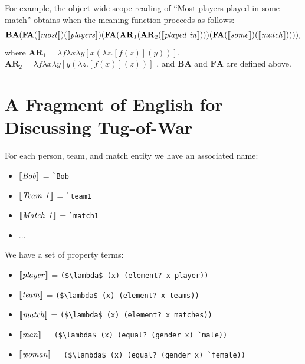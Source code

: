 \documentclass[pdfextras]{handbook}
\newcommand{\llbracket}{\ensuremath{\left [\!\left [}}%
\newcommand{\rrbracket}{\ensuremath{\right ]\!\right ]}}
\providecommand{\sv}[1]{\ensuremath{\llbracket \mathit{#1} \rrbracket}}
\newcommand{\denot}[1]{\ensuremath{\llbracket \mathit{#1} \rrbracket}}
\begin{document}
For example, the object wide scope reading of ``Most players played in some match'' obtains when the meaning function proceeds as follows: 
$$
\mathbf{BA}(\mathbf{FA}(\sv{most})(\sv{players})
(\mathbf{FA}(\mathbf{AR}_1(\mathbf{AR}_2(\sv{played\ in})))
(\mathbf{FA}(\sv{some})(\sv{match})))),
$$  
where $\mathbf{AR}_1 = \lambda f \lambda x \lambda y [x(\lambda z . [f(z)] (y))]$, $\mathbf{AR}_2 = \lambda f \lambda x \lambda y [y(\lambda z . [f(x)] (z))]$ \cite[cf.][pp.453ff.]{barker05}, and $\mathbf{BA}$ and $\mathbf{FA}$ are defined above.




\section{A Fragment of English for Discussing Tug-of-War}
\label{tow-lexicon}

For each person, team, and match entity we have an associated name:
\begin{itemize}
\item \denot{Bob} = \lstinline{`Bob}
\item \denot{Team\ 1} = \lstinline{`team1}
\item \denot{Match\ 1} = \lstinline{`match1}
\item ...
\end{itemize}

We have a set of property terms:
\begin{itemize}
\item \sv{player} = \lstinline[mathescape]{($\lambda$ (x) (element? x player))}  
\item \sv{team} = \lstinline[mathescape]{($\lambda$ (x) (element? x teams))}
\item \sv{match} = \lstinline[mathescape]{($\lambda$ (x) (element? x matches))}
\item \sv{man} = \lstinline[mathescape]{($\lambda$ (x) (equal? (gender x) `male))}
\item \sv{woman} = \lstinline[mathescape]{($\lambda$ (x) (equal? (gender x) `female))}
\end{itemize}
\end{document}

